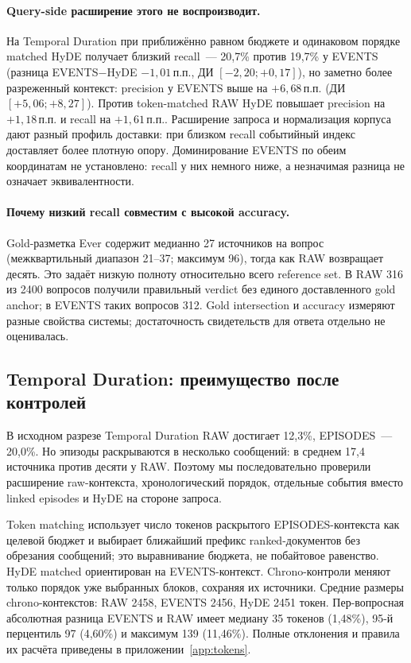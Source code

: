 \documentclass[11pt,a4paper]{article}
\newcommand{\raw}{RAW}
\newcommand{\events}{EVENTS}
\newcommand{\pp}{\,\text{п.п.}}
\begin{document}
\paragraph{Query-side расширение этого не воспроизводит.}
На Temporal Duration при приближённо равном бюджете и одинаковом порядке matched
HyDE получает близкий recall~--- 20,7\% против 19,7\% у \events{} (разница
EVENTS$-$HyDE $-1{,}01\pp$, ДИ $[-2{,}20;+0{,}17]$), но заметно более разреженный
контекст: precision у \events{} выше на $+6{,}68\pp$ (ДИ $[+5{,}06;+8{,}27]$).
Против token-matched \raw{} HyDE повышает precision на $+1{,}18\pp$ и recall на
$+1{,}61\pp$. Расширение запроса и нормализация корпуса дают разный профиль
доставки: при близком recall событийный индекс доставляет более плотную опору.
Доминирование \events{} по обеим координатам не установлено: recall у них немного
ниже, а незначимая разница не означает эквивалентности.

\paragraph{Почему низкий recall совместим с высокой accuracy.}
Gold-разметка Ever содержит медианно 27 источников на вопрос
(межквартильный диапазон 21--37; максимум 96), тогда как RAW возвращает десять.
Это задаёт низкую полноту относительно всего reference set.
В RAW 316 из 2400 вопросов получили правильный verdict без единого
доставленного gold anchor; в EVENTS таких вопросов 312.
Gold intersection и accuracy измеряют разные свойства системы; достаточность
свидетельств для ответа отдельно не оценивалась.

\subsection{Temporal Duration: преимущество после контролей}
\label{sec:temporal}

В исходном разрезе Temporal Duration RAW достигает 12,3\%, EPISODES~---
20,0\%. Но эпизоды раскрываются в несколько сообщений: в среднем 17,4
источника против десяти у RAW. Поэтому мы последовательно проверили
расширение raw-контекста, хронологический порядок, отдельные события вместо
linked episodes и HyDE на стороне запроса.

Token matching использует число токенов раскрытого EPISODES-контекста как
целевой бюджет и выбирает ближайший префикс ranked-документов без обрезания
сообщений; это выравнивание бюджета, не побайтовое равенство.
HyDE matched ориентирован на EVENTS-контекст. Chrono-контроли меняют только
порядок уже выбранных блоков, сохраняя их источники.
Средние размеры chrono-контекстов: RAW 2458, EVENTS 2456, HyDE 2451 токен.
Пер-вопросная абсолютная разница EVENTS и RAW имеет медиану 35 токенов
(1,48\%), 95-й перцентиль 97 (4,60\%) и максимум 139 (11,46\%).
Полные отклонения и правила их расчёта приведены в приложении~\ref{app:tokens}.
\end{document}
